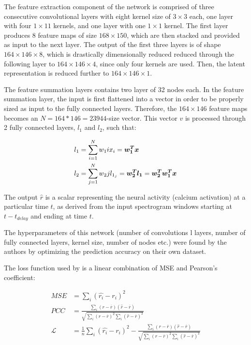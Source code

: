 
The feature extraction component of the network is comprised of three consecutive convolutional layers with eight kernel size of $3 \times 3$ each, one layer with four $1 \times 1 1$ kernels, and one layer with one $1 \times 1$ kernel. The first layer produces 8 feature maps of size $168 \times 150$, which are then stacked and provided as input to the next layer. The output of the first three layers is of shape $164 \times 146 \times 8$, which is drastically dimensionally reduced reduced through the following layer to $164 \times 146 \times 4$, since only four kernels are used. Then, the latent representation is reduced further to $164 \times 146 \times 1$.

The feature summation layers contains two layer of 32 nodes each. In the feature summation layer, the input is first flattened into a vector in order to be properly sized as input to the fully connected layers. Therefore, the $164 \times 146$ feature maps becomes an $N = 164 * 146 = 23944$-size vector. This vector $v$ is processed through 2 fully connected layers, $l_1$ and $l_2$, such that:

\begin{align}
	l_1 &= \sum_{i=1}^N w_1i x_i = \bm{w_1^T}\bm{x} \\
	l_2 &= \sum_{j=1}^N w_2j l_{1_j} = \bm{w_2^T}\bm{l_1} = \bm{w_2^T}\bm{w_1^T}\bm{x}
\end{align}

The output $\hat{r}$ is a scalar representing the neural activity (calcium activation) at a particular time $t$, as derived from the input spectrogram windows starting at $t - t_{delay}$ and ending at time $t$.

The hyperparameters of this network (number of convolutions l layers, number of fully connected layers, kernel size, number of nodes etc.) were found by the authors by optimizing the prediction accuracy on their own dataset.

The loss function used by \parencite{keshishianEstimatingInterpretingNonlinear2020} is a linear combination of MSE and Pearson's coefficient:

\begin{align}
	MSE &= \sum_i (\hat{r_i} -r_i)^2 \\
	PCC &= \frac{\sum _i (r - \overline{r}) (\hat{r} - \overline{r})}{\sqrt{\sum _i (r - \overline{r})^2 \sum _i (\hat{r} - \overline{r})^2}} \\
	\mathcal{L} &= \frac{1}{n} \sum_i (\hat{r_i} -r_i)^2 - \frac{\sum _i (r - \overline{r}) (\hat{r} - \overline{r})}{\sqrt{\sum _i (r - \overline{r})^2 \sum _i (\hat{r} - \overline{r})^2}}
\end{align}


